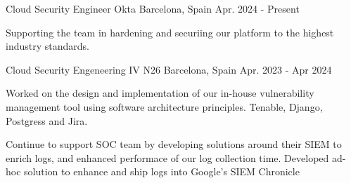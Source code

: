 
\begin{cventries}
	\cventry
	{Cloud Security Engineer} %
	{Okta} %
	{Barcelona, Spain} %
	{Apr. 2024 - Present} %
	{
		\begin{cvitems} %
			\item {Supporting the team in hardening and securiing our platform to the highest industry standards.}
		\end{cvitems}
	  }
	  \vspace{0.5em}
	\cventry
	{Cloud Security Engeneering IV} %
	{N26} %
	{Barcelona, Spain} %
	{Apr. 2023 - Apr 2024} %
	{
		\begin{cvitems} %
            \item {Worked on the design and implementation of our in-house vulnerability management tool using software architecture principles. Tenable, Django, Postgress and Jira.}
			\item {Continue to support SOC team by developing solutions around their SIEM to enrich logs, and enhanced performace of our log collection time. Developed ad-hoc solution to enhance and ship logs into Google's SIEM Chronicle }
		\end{cvitems}
	}


\end{cventries}
